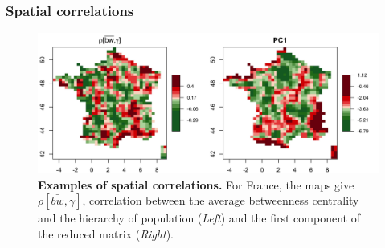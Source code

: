 \subsubsection{Spatial correlations}


\begin{figure}
\includegraphics[width=\linewidth]{figures/4-1-3-fig-staticcorrs-mapscorrs}
\caption{\textbf{Examples of spatial correlations.} For France, the maps give $\rho\left[\bar{bw},\gamma\right]$, correlation between the average betweenness centrality and the hierarchy of population (\textit{Left}) and the first component of the reduced matrix (\textit{Right}).\label{fig:staticcorrs:mapscorrs}}
\end{figure}


